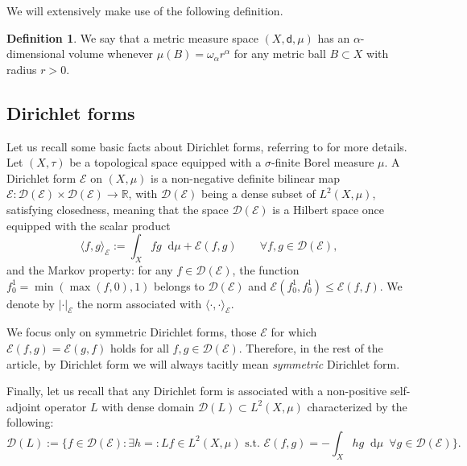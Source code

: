 \documentclass[JEP,XML,SOM,Unicode,published]{cedram}
\let\sep:
\theoremstyle{plain}
\theoremstyle{definition}
\newtheorem{definition}[theorem]{Definition}
\newcommand{\setR}{\mathbb{R}}
\newcommand{\cE}{\mathcal{E}}
\newcommand{\cD}{\mathcal{D}}
\newcommand{\di}{\mathop{}\!\mathrm{d}}
\newcommand{\dist}{\mathsf{d}}
\begin{document}
We will extensively make use of the following definition.

\begin{definition}
We say that a metric measure space $(X,\dist,\mu)$ has an $\alpha$-dimensional volume whenever $\mu(B)=\omega_\alpha r^\alpha$ for any metric ball $B\subset X$ with radius $r>0$.
\end{definition}

\subsection*{Dirichlet forms}

Let us recall some basic facts about Dirichlet forms, referring to \eg \cite{FukushimaOshidaTakeda, Sturm1, KoskelaZhou} for more details. Let $(X,\tau)$ be a topological space equipped with a $\sigma$-finite Borel measure $\mu$. A Dirichlet form $\cE$ on $(X,\mu)$ is a non-negative definite bilinear map $\cE: \cD(\cE) \times \cD(\cE) \to \setR$, with $\cD(\cE)$ being a dense subset of $L^2(X,\mu)$, satisfying closedness, meaning that the space $\cD(\cE)$ is a Hilbert space once equipped with the scalar product
\begin{equation}\label{eq:scalE}
\langle f, g \rangle_{\cE}:= \int_{X} f g \di \mu + \cE(f,g)\qquad \forall f, g \in \cD(\cE),
\end{equation}
and the Markov property: for any $f \in \cD(\cE)$, the function $f_{0}^{1} = \min (\max(f,0),1)$ belongs to $\cD(\cE)$ and $\cE(f_{0}^{1},f_{0}^{1}) \le \cE(f,f)$. We denote by $|\cdot|_\cE$ the norm associated with $\langle \cdot, \cdot \rangle_\cE$.

We focus only on symmetric Dirichlet forms, \ie those $\cE$ for which $\cE(f,g)=\cE(g,f)$ holds for all $f,g \in \cD(\cE)$. Therefore, in the rest of the article, by Dirichlet form we will always tacitly mean \textit{symmetric} Dirichlet form.

Finally, let us recall that any Dirichlet form is associated with a non-positive self-adjoint operator $L$ with dense domain $\cD(L) \subset L^2(X,\mu)$ characterized by the following:
\[
\cD(L):=\biggl\{f \in \cD(\cE) \sep \exists h=:Lf \in L^2(X,\mu)\, \, \text{s.t.}\, \, \cE(f,g)= -\int_X h g \di \mu \, \, \, \forall g \in \cD(\cE)\biggr\}.
\]
\end{document}
